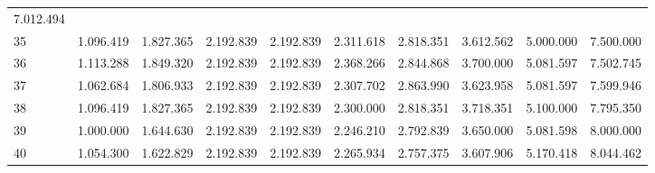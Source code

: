 \begin{tabular}{llllllllll}
  \multicolumn{1}{r}{7.012.494} \\
\multicolumn{1}{l}{\hspace{1em}35} &
  \multicolumn{1}{|r}{1.096.419} &
  \multicolumn{1}{r}{1.827.365} &
  \multicolumn{1}{r}{2.192.839} &
  \multicolumn{1}{r}{2.192.839} &
  \multicolumn{1}{r}{2.311.618} &
  \multicolumn{1}{r}{2.818.351} &
  \multicolumn{1}{r}{3.612.562} &
  \multicolumn{1}{r}{5.000.000} &
  \multicolumn{1}{r}{7.500.000} \\
\multicolumn{1}{l}{\hspace{1em}36} &
  \multicolumn{1}{|r}{1.113.288} &
  \multicolumn{1}{r}{1.849.320} &
  \multicolumn{1}{r}{2.192.839} &
  \multicolumn{1}{r}{2.192.839} &
  \multicolumn{1}{r}{2.368.266} &
  \multicolumn{1}{r}{2.844.868} &
  \multicolumn{1}{r}{3.700.000} &
  \multicolumn{1}{r}{5.081.597} &
  \multicolumn{1}{r}{7.502.745} \\
\multicolumn{1}{l}{\hspace{1em}37} &
  \multicolumn{1}{|r}{1.062.684} &
  \multicolumn{1}{r}{1.806.933} &
  \multicolumn{1}{r}{2.192.839} &
  \multicolumn{1}{r}{2.192.839} &
  \multicolumn{1}{r}{2.307.702} &
  \multicolumn{1}{r}{2.863.990} &
  \multicolumn{1}{r}{3.623.958} &
  \multicolumn{1}{r}{5.081.597} &
  \multicolumn{1}{r}{7.599.946} \\
\multicolumn{1}{l}{\hspace{1em}38} &
  \multicolumn{1}{|r}{1.096.419} &
  \multicolumn{1}{r}{1.827.365} &
  \multicolumn{1}{r}{2.192.839} &
  \multicolumn{1}{r}{2.192.839} &
  \multicolumn{1}{r}{2.300.000} &
  \multicolumn{1}{r}{2.818.351} &
  \multicolumn{1}{r}{3.718.351} &
  \multicolumn{1}{r}{5.100.000} &
  \multicolumn{1}{r}{7.795.350} \\
\multicolumn{1}{l}{\hspace{1em}39} &
  \multicolumn{1}{|r}{1.000.000} &
  \multicolumn{1}{r}{1.644.630} &
  \multicolumn{1}{r}{2.192.839} &
  \multicolumn{1}{r}{2.192.839} &
  \multicolumn{1}{r}{2.246.210} &
  \multicolumn{1}{r}{2.792.839} &
  \multicolumn{1}{r}{3.650.000} &
  \multicolumn{1}{r}{5.081.598} &
  \multicolumn{1}{r}{8.000.000} \\
\multicolumn{1}{l}{\hspace{1em}40} &
  \multicolumn{1}{|r}{1.054.300} &
  \multicolumn{1}{r}{1.622.829} &
  \multicolumn{1}{r}{2.192.839} &
  \multicolumn{1}{r}{2.192.839} &
  \multicolumn{1}{r}{2.265.934} &
  \multicolumn{1}{r}{2.757.375} &
  \multicolumn{1}{r}{3.607.906} &
  \multicolumn{1}{r}{5.170.418} &
  \multicolumn{1}{r}{8.044.462} \\

\end{tabular}
